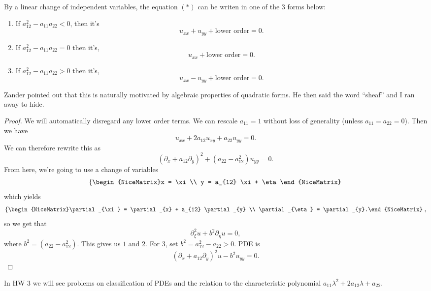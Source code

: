 \begin{theorem}
	By a linear change of independent variables, the equation \( (*) \) can be writen in one of the 3 forms below:
	\begin{enumerate}
	
		\item If \( a_{12}^{2} - a_{11} a_{22} < 0 \), then it's 
		\[ u_{xx} + u_{yy} + \text{lower order} = 0. \]
		\item If \( a_{12}^{2} - a_{11}a_{22} = 0 \) then it's,
		\[ u_{xx} + \text{lower order} = 0. \]
		\item If \( a_{12}^{2} - a_{11}a_{22} > 0 \) then it's,
			\[ u_{xx} - u_{yy} + \text{lower order} = 0. \]
	
	\end{enumerate}
	Zander pointed out that this is naturally motivated by algebraic properties of quadratic forms. He then said the word ``sheaf'' and I ran away to hide.
\end{theorem}
\begin{proof}
	We will automatically disregard any lower order terms. We can rescale \( a_{1 1} = 1 \) without loss of generality (unless \( a_{1 1} = a_{2 2} = 0 \)). Then we have
	\[ u_{x x} + 2 a_{12}u_{xy} + a_{22}u_{y y} = 0. \] 
	We can therefore rewrite this as
	\[ (\partial_{x} + a_{12}\partial_{y})^{2} + (a_{22} - a_{12}^{2}) u_{yy} = 0. \]
	From here, we're going to use a change of variables 
	\[ \left\{\begin{NiceMatrix}x = \xi \\ y = a_{12} \xi + \eta\end{NiceMatrix}\right.  \]
	which yields
	\[ \left\{\begin{NiceMatrix}\partial_{\xi} = \partial_{x} + a_{12} \partial_{y} \\ \partial_{\eta} = \partial_{y}.\end{NiceMatrix}\right.,  \]
	so we get that
	\[ \partial_{\xi}^{2} u + b^{2} \partial_{\eta} u = 0, \]
	where \( b^{2} = (a_{22} - a^{2}_{12}) \). This gives us \( 1 \) and \( 2 \). For \( 3 \), set \( b^{2} = a_{12}^{2} - a_{22} > 0. \) PDE is
	\[ (\partial_{x} + a_{12}\partial_{y})^{2} u - b^{2} u_{yy} = 0. \]
\end{proof}

In HW 3 we will see problems on classification of PDEs and the relation to the characteristic polynomial \( a_{11} \lambda^{2} + 2 a_{12} \lambda + a_{22} \).

